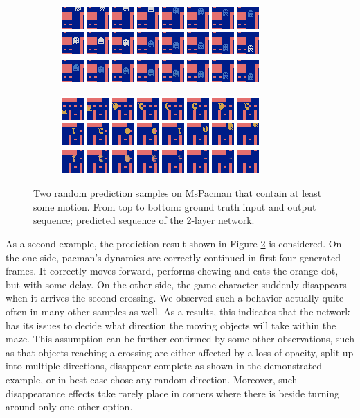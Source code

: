 \begin{figure}[h!tb]
\centering
\begin{subfigure}{0.49\textwidth}
  \centering
  \includegraphics[width=0.92\linewidth]{figures/pred/pac/random/pred-00.png}
  \caption{}
  \label{fig:pac-pred-random1}
\end{subfigure}%
\begin{subfigure}{0.49\textwidth}
  \centering
  \includegraphics[width=0.92\linewidth]{figures/pred/pac/random/pred-04.png}
  \caption{}
  \label{fig:pac-pred-random2}
\end{subfigure}
\caption[Random Prediction Samples on MsPacman]{Two random prediction samples on MsPacman that contain at least some motion. From top to bottom: ground truth input and output sequence; predicted sequence of the 2-layer network.} \label{fig:pac-pred-random}
\end{figure}

As a second example, the prediction result shown in Figure \ref{fig:pac-pred-random2} is considered. On the one side, pacman's dynamics are correctly continued in first four generated frames. It correctly moves forward, performs chewing and eats the orange dot, but with some delay. On the other side, the game character suddenly disappears when it arrives the second crossing. We observed such a behavior actually quite often in many other samples as well. As a results, this indicates that the network has its issues to decide what direction the moving objects will take within the maze. This assumption can be further confirmed by some other observations, such as that objects reaching a crossing are either affected by a loss of opacity, split up into multiple directions, disappear complete as shown in the demonstrated example, or in best case chose any random direction. Moreover, such disappearance effects take rarely place in corners where there is beside turning around only one other option.

